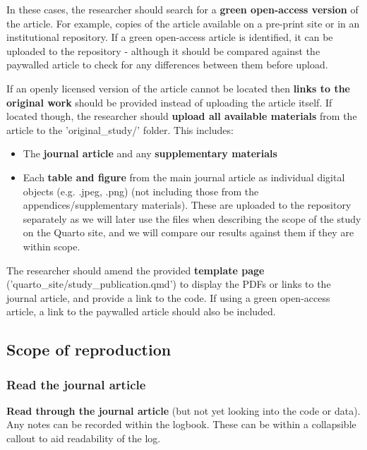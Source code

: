 In these cases, the researcher should search for a \textbf{green open-access version} of the article. For example, copies of the article available on a pre-print site or in an institutional repository. If a green open-access article is identified, it can be uploaded to the repository - although it should be compared against the paywalled article to check for any differences between them before upload.

If an openly licensed version of the article cannot be located then \textbf{links to the original work} should be provided instead of uploading the article itself. If located though, the researcher should \textbf{upload all available materials} from the article to the 'original\_study/' folder. This includes:
\begin{itemize}
    \item The \textbf{journal article} and any \textbf{supplementary materials}
    \item Each \textbf{table and figure} from the main journal article as individual digital objects (e.g. .jpeg, .png) (not including those from the appendices/supplementary materials). These are uploaded to the repository separately as we will later use the files when describing the scope of the study on the Quarto site, and we will compare our results against them if they are within scope.
\end{itemize}

The researcher should amend the provided \textbf{template page} ('quarto\_site/study\_publication.qmd')\autocite{heather_template_2024} to display the PDFs or links to the journal article, and provide a link to the code. If using a green open-access article, a link to the paywalled article should also be included.

\vspace{0.5cm}
\subsection{Scope of reproduction}

\subsubsection{Read the journal article}

\textbf{Read through the journal article} (but not yet looking into the code or data). Any notes can be recorded within the logbook. These can be within a collapsible callout to aid readability of the log.

